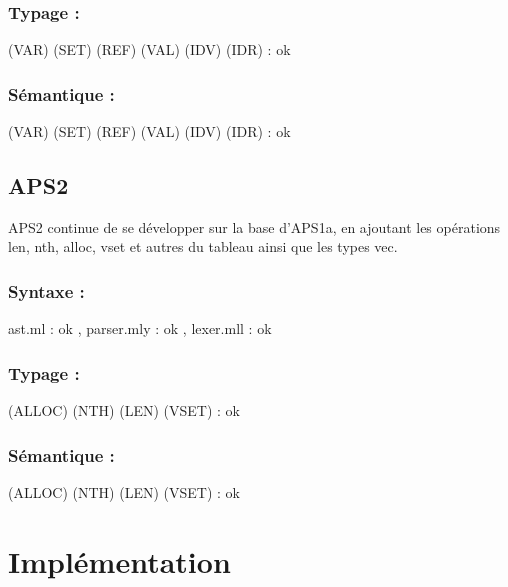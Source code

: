 \documentclass{article}
\begin{document}
	\subsubsection*{Typage :} 
	(VAR) (SET) (REF) (VAL) (IDV) (IDR) : ok 
	\subsubsection*{Sémantique :}

	(VAR) (SET) (REF) (VAL) (IDV) (IDR) : ok
	
	\subsection*{APS2}
	APS2 continue de se développer sur la base d'APS1a, en ajoutant les opérations len, nth, alloc, vset et autres du tableau ainsi que les types vec.
	
	\subsubsection*{Syntaxe :}
	ast.ml : ok , parser.mly : ok , lexer.mll : ok
	
	\subsubsection*{Typage :} 
	(ALLOC)	(NTH) (LEN)	(VSET) : ok
	
	\subsubsection*{Sémantique :}
	(ALLOC) (NTH) (LEN) (VSET) : ok
	

	
	\section{Implémentation}
	
\end{document}
